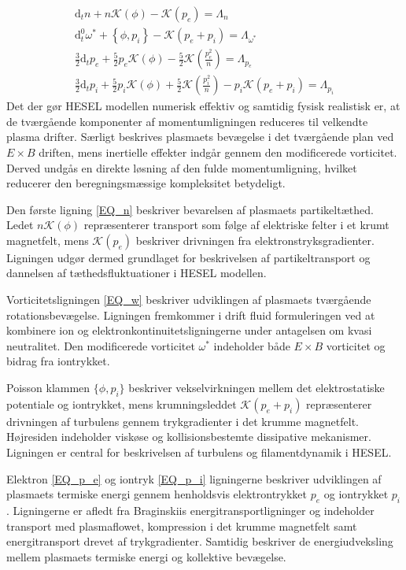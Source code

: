\begin{gather}
    \mathrm{d} _t n + n\mathcal{K}(\phi) - \mathcal{K}(p_e) = \Lambda_n  \label{EQ_n} \\ 
    \mathrm{d}_t^0 \omega^* + \left\{\phi, p_i \right\} - \mathcal{K}(p_e+p_i)=\Lambda_{\omega^*} \label{EQ_w} \\
    \frac{3}{2}\mathrm{d} _t p_e + \frac{5}{2}p_e \mathcal{K}(\phi) -\frac{5}{2}\mathcal{K}\left(\frac{p_e^2}{n}\right)= \Lambda_{p_e}\label{EQ_p_e} \\
    \frac{3}{2}\mathrm{d} _t p_i + \frac{5}{2}p_i \mathcal{K}(\phi) +\frac{5}{2}\mathcal{K}\left(\frac{p_i^2}{n}\right) - p_i\mathcal{K}(p_e+p_i) = \Lambda_{p_i} \label{EQ_p_i}
\end{gather}
Det der gør HESEL modellen numerisk effektiv og samtidig fysisk realistisk er, at de tværgående komponenter af momentumligningen reduceres til velkendte plasma drifter.
Særligt beskrives plasmaets bevægelse i det tværgående plan ved $E\times B$ driften, mens inertielle effekter indgår gennem den modificerede vorticitet.
Derved undgås en direkte løsning af den fulde momentumligning, hvilket reducerer den beregningsmæssige kompleksitet betydeligt. 

Den første ligning \eqref{EQ_n} beskriver bevarelsen af plasmaets partikeltæthed. Ledet $n\mathcal{K}(\phi)$ 
repræsenterer transport som følge af elektriske felter i et krumt magnetfelt, mens $\mathcal{K}(p_e)$ beskriver drivningen fra elektronstryksgradienter.
Ligningen udgør dermed grundlaget for beskrivelsen af partikeltransport og dannelsen af tæthedsfluktuationer i HESEL modellen. 

Vorticitetsligningen \eqref{EQ_w} beskriver udviklingen af plasmaets tværgående rotationsbevægelse.
Ligningen fremkommer i drift fluid formuleringen ved at kombinere ion og elektronkontinuitetsligningerne under antagelsen om kvasi neutralitet.
Den modificerede vorticitet $\omega^*$ indeholder både $E\times B$ vorticitet og bidrag fra iontrykket.

Poisson klammen $\{\phi,p_i\}$ beskriver vekselvirkningen mellem det elektrostatiske potentiale og iontrykket, mens krumningsleddet $\mathcal{K}(p_e+p_i)$ repræsenterer drivningen af turbulens gennem trykgradienter i det krumme magnetfelt.
Højresiden indeholder viskøse og kollisionsbestemte dissipative mekanismer.
Ligningen er central for beskrivelsen af turbulens og filamentdynamik i HESEL.

Elektron \eqref{EQ_p_e} og iontryk \eqref{EQ_p_i} ligningerne beskriver udviklingen af plasmaets termiske energi gennem henholdsvis elektrontrykket $p_e$ og iontrykket $p_i$.
Ligningerne er afledt fra Braginskiis energitransportligninger og indeholder transport med plasmaflowet, kompression i det krumme magnetfelt samt energitransport drevet af trykgradienter.
Samtidig beskriver de energiudveksling mellem plasmaets termiske energi og kollektive bevægelse.

